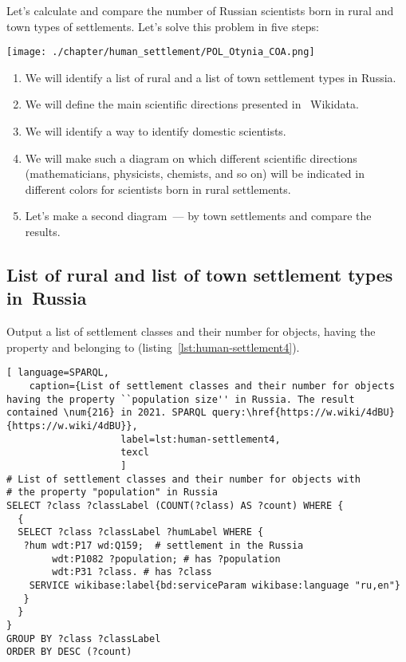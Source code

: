 Let's calculate and compare the number of Russian scientists born in rural and town types of settlements. 
Let's solve this problem in five steps:

\begin{marginfigure} [0.0 cm]
{\texttt{[image: ./chapter/human\_settlement/POL\_Otynia\_COA.png]}}
    \caption {The coat of arms of the ``human settlement'' of which country is depicted? \newline%
See~\protect\ref{answer:flag_human_settlements} on page~\protect\pageref{answer:flag_human_settlements}.}
    \label {fig:flag_question_human_settlements4}%
\end{marginfigure}

\begin{enumerate}
\item We will identify a list of rural and a list of town settlement types in Russia.
\item We will define the main scientific directions presented in ~Wikidata.
\item We will identify a way to identify domestic scientists.
\item We will make such a diagram on which different scientific directions (mathematicians, physicists, chemists, and so on) will be indicated in different colors for scientists born in rural settlements.
\item Let's make a second diagram~--- by town settlements and compare the results.
\end{enumerate}

\subsection{List of rural and list of town settlement types in~Russia}

Output a list of settlement classes and their number for objects, 
having the property 
and belonging to  (listing~\ref{lst:human-settlement4}).

\begin{lstlisting}[ language=SPARQL, 
    caption={List of settlement classes and their number for objects having the property ``population size'' in Russia. The result contained \num{216} in 2021. SPARQL query:\href{https://w.wiki/4dBU}{https://w.wiki/4dBU}}, 
                    label=lst:human-settlement4,
                    texcl 
                    ]
# List of settlement classes and their number for objects with 
# the property "population" in Russia
SELECT ?class ?classLabel (COUNT(?class) AS ?count) WHERE {
  {
  SELECT ?class ?classLabel ?humLabel WHERE {
   ?hum wdt:P17 wd:Q159;  # settlement in the Russia
        wdt:P1082 ?population; # has ?population
        wdt:P31 ?class. # has ?class
    SERVICE wikibase:label{bd:serviceParam wikibase:language "ru,en"}
   }
  }
}
GROUP BY ?class ?classLabel
ORDER BY DESC (?count)
\end{lstlisting}%

